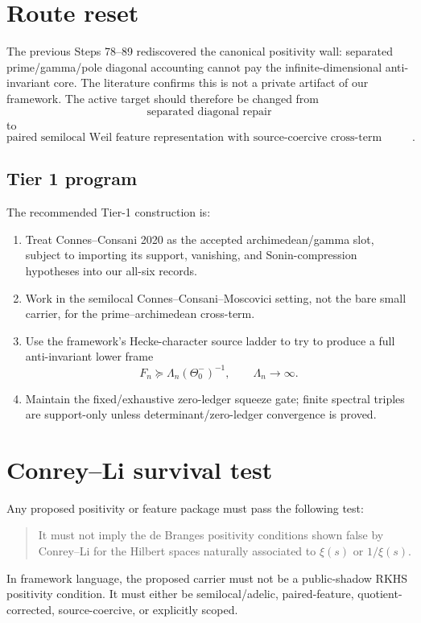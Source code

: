 \documentclass[11pt]{article}
\begin{document}
\section*{Route reset}
The previous Steps 78--89 rediscovered the canonical positivity wall: separated prime/gamma/pole diagonal accounting cannot pay the infinite-dimensional anti-invariant core.  The literature confirms this is not a private artifact of our framework.  The active target should therefore be changed from
\[
\text{separated diagonal repair}
\]
to
\[
\boxed{
\text{paired semilocal Weil feature representation with source-coercive cross-term control}.
}
\]

\subsection*{Tier 1 program}
The recommended Tier-1 construction is:
\begin{enumerate}
\item Treat Connes--Consani 2020 as the accepted archimedean/gamma slot, subject to importing its support, vanishing, and Sonin-compression hypotheses into our all-six records.
\item Work in the semilocal Connes--Consani--Moscovici setting, not the bare small carrier, for the prime--archimedean cross-term.
\item Use the framework's Hecke-character source ladder to try to produce a full anti-invariant lower frame
\[
F_n\succeq \Lambda_n(\Theta_0^-)^{-1},\qquad \Lambda_n\to\infty.
\]
\item Maintain the fixed/exhaustive zero-ledger squeeze gate; finite spectral triples are support-only unless determinant/zero-ledger convergence is proved.
\end{enumerate}

\section*{Conrey--Li survival test}
Any proposed positivity or feature package must pass the following test:
\begin{quote}
It must not imply the de Branges positivity conditions shown false by Conrey--Li for the Hilbert spaces naturally associated to $\xi(s)$ or $1/\xi(s)$.
\end{quote}
In framework language, the proposed carrier must not be a public-shadow RKHS positivity condition. It must either be semilocal/adelic, paired-feature, quotient-corrected, source-coercive, or explicitly scoped.
\end{document}
